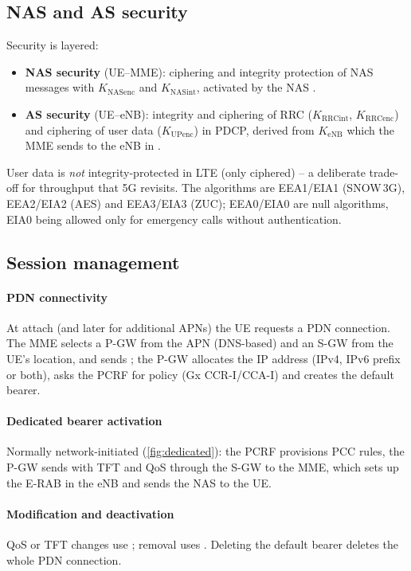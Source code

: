 \documentclass[11pt,a4paper]{article}
\begin{document}
\subsection{NAS and AS security}
Security is layered:
\begin{itemize}
  \item \textbf{NAS security} (UE--MME): ciphering and integrity protection of NAS messages with
        $K_{\mathrm{NASenc}}$ and $K_{\mathrm{NASint}}$, activated by the NAS .
  \item \textbf{AS security} (UE--eNB): integrity and ciphering of RRC ($K_{\mathrm{RRCint}}$,
        $K_{\mathrm{RRCenc}}$) and ciphering of user data ($K_{\mathrm{UPenc}}$) in PDCP, derived from
        $K_{\mathrm{eNB}}$ which the MME sends to the eNB in .
\end{itemize}
User data is \emph{not} integrity-protected in LTE (only ciphered) -- a deliberate trade-off for
throughput that 5G revisits. The algorithms are EEA1/EIA1 (SNOW\,3G), EEA2/EIA2 (AES) and EEA3/EIA3
(ZUC); EEA0/EIA0 are null algorithms, EIA0 being allowed only for emergency calls without
authentication.

\subsection{Session management}
\paragraph{PDN connectivity} At attach (and later for additional APNs) the UE requests a PDN
connection. The MME selects a P-GW from the APN (DNS-based) and an S-GW from the UE's location, and
sends ; the P-GW allocates the IP address (IPv4, IPv6 prefix or both), asks
the PCRF for policy (Gx CCR-I/CCA-I) and creates the default bearer.
\paragraph{Dedicated bearer activation} Normally network-initiated (\cref{fig:dedicated}): the PCRF
provisions PCC rules, the P-GW sends  with TFT and QoS through the S-GW to
the MME, which sets up the E-RAB in the eNB and sends the NAS  to the UE.
\paragraph{Modification and deactivation} QoS or TFT changes use ; removal
uses . Deleting the default bearer deletes the whole PDN connection.
\end{document}
